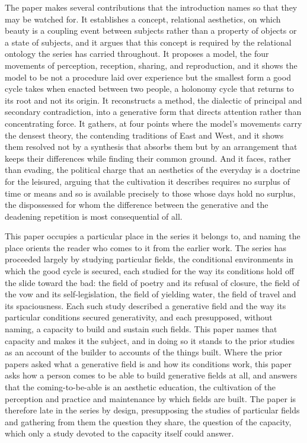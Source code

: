 \medskip\noindent

The paper makes several contributions that the introduction names so that they may be watched for. It establishes a concept, relational aesthetics, on which beauty is a coupling event between subjects rather than a property of objects or a state of subjects, and it argues that this concept is required by the relational ontology the series has carried throughout. It proposes a model, the four movements of perception, reception, sharing, and reproduction, and it shows the model to be not a procedure laid over experience but the smallest form a good cycle takes when enacted between two people, a holonomy cycle that returns to its root and not its origin. It reconstructs a method, the dialectic of principal and secondary contradiction, into a generative form that directs attention rather than concentrating force. It gathers, at four points where the model's movements carry the densest theory, the contending traditions of East and West, and it shows them resolved not by a synthesis that absorbs them but by an arrangement that keeps their differences while finding their common ground. And it faces, rather than evading, the political charge that an aesthetics of the everyday is a doctrine for the leisured, arguing that the cultivation it describes requires no surplus of time or means and so is available precisely to those whose days hold no surplus, the dispossessed for whom the difference between the generative and the deadening repetition is most consequential of all.

\medskip\noindent

This paper occupies a particular place in the series it belongs to, and naming the place orients the reader who comes to it from the earlier work. The series has proceeded largely by studying particular fields, the conditional environments in which the good cycle is secured, each studied for the way its conditions hold off the slide toward the bad: the field of poetry and its refusal of closure, the field of the vow and its self-legislation, the field of yielding water, the field of travel and its spaciousness. Each such study described a generative field and the way its particular conditions secured generativity, and each presupposed, without naming, a capacity to build and sustain such fields. This paper names that capacity and makes it the subject, and in doing so it stands to the prior studies as an account of the builder to accounts of the things built. Where the prior papers asked what a generative field is and how its conditions work, this paper asks how a person comes to be able to build generative fields at all, and answers that the coming-to-be-able is an aesthetic education, the cultivation of the perception and practice and maintenance by which fields are built. The paper is therefore late in the series by design, presupposing the studies of particular fields and gathering from them the question they share, the question of the capacity, which only a study devoted to the capacity itself could answer.

